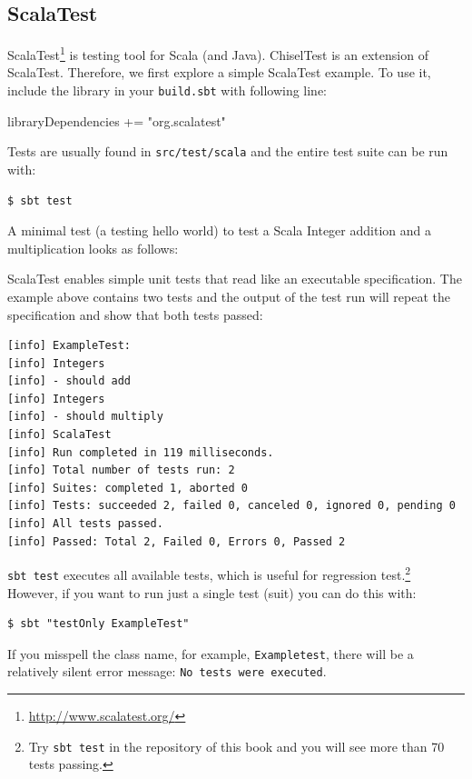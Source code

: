 \documentclass[%
    10pt,
    headinclude, footexclude,
    openright, %
    notitlepage,
    cleardoubleempty,
    headsepline,
    pointlessnumbers,
    bibtotoc, idxtotoc,
    ]{scrbook}
\newcommand{\code}[1]{{\small{\texttt{#1}}}}
\newcommand{\codefoot}[1]{{\footnotesize{\texttt{#1}}}}
\newcommand{\myref}[2]{\href{#1}{#2}}
\renewcommand{\myref}[2]{{#2}{\footnote{\url{#1}}}}
\begin{document}
\subsection{ScalaTest}

\myref{http://www.scalatest.org/}{ScalaTest} is  testing tool for Scala (and Java). ChiselTest is an extension
of ScalaTest. Therefore, we first explore a simple ScalaTest example. To use it, include the library
in your \code{build.sbt} with following line:

\begin{chisel}
libraryDependencies += "org.scalatest" %
\end{chisel}

\noindent Tests are usually found in \code{src/test/scala} and the entire test suite can be run with:

\begin{verbatim}
$ sbt test
\end{verbatim}

\noindent A minimal test (a testing hello world) to test a Scala Integer
addition and a multiplication looks as follows:


ScalaTest enables simple unit tests that read like an executable specification.
The example above contains two tests and the output of the test run will repeat the specification
and show that both tests passed:

\begin{verbatim}
[info] ExampleTest:
[info] Integers
[info] - should add
[info] Integers
[info] - should multiply
[info] ScalaTest
[info] Run completed in 119 milliseconds.
[info] Total number of tests run: 2
[info] Suites: completed 1, aborted 0
[info] Tests: succeeded 2, failed 0, canceled 0, ignored 0, pending 0
[info] All tests passed.
[info] Passed: Total 2, Failed 0, Errors 0, Passed 2
\end{verbatim}


\code{sbt test} executes all available tests, which is useful for regression
test.\footnote{Try \codefoot{sbt test} in the repository of this book and you
will see more than 70 tests passing.}
However, if you want to run just a single test (suit) you can do this with:

\begin{verbatim}
$ sbt "testOnly ExampleTest"
\end{verbatim}

\noindent If you misspell the class name, for example, \code{Exampletest},
there will be a relatively silent error message: \code{No tests were executed}.
\end{document}
